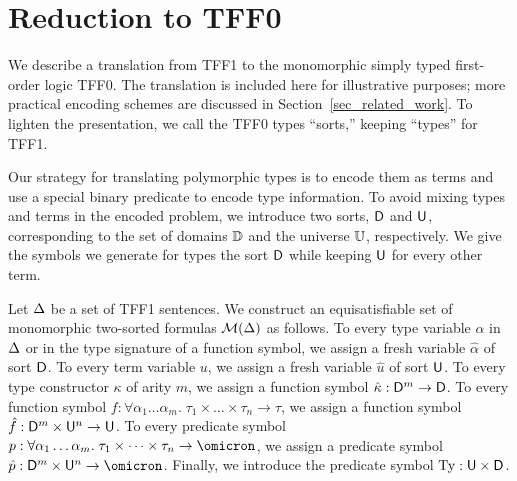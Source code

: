 \section{Reduction to TFF0} \label{sec:trans}

We describe a translation from TFF1 to the monomorphic simply typed first-order
logic TFF0. The translation is included here for illustrative purposes; more
practical encoding schemes are discussed in Section~\ref{sec_related_work}. To
lighten the presentation, we call the TFF0 types ``sorts,'' keeping ``types''
for TFF1.

Our strategy for translating polymorphic types is to encode them as terms and
use a special binary predicate to encode type information.
%
To avoid mixing types
and terms in the encoded problem, we introduce two sorts, $\mathsf{D}$ and $\mathsf{U}$,
corresponding to the set of domains $\mathbb{D}$ and the universe $\mathbb{U}$,
respectively. We give the symbols we generate for types the sort $\mathsf{D}$ while
keeping $\mathsf{U}$ for every other term.

Let $\mathrm{\Delta}$ be a set of TFF1 sentences.
We construct an equisatisfiable set of monomorphic two-sorted
formulas $\mathcal{M}(\mathrm{\Delta})$ as follows.
%
To every type variable $\alpha$ in $\mathrm{\Delta}$ or in the type signature of a function
symbol, we assign a fresh variable $\hat{\alpha}$ of sort $\mathsf{D}$.
To every term variable $u$, we assign
a fresh variable $\hat{u}$ of sort $\mathsf{U}$.
To every type constructor $\kappa$ of arity $m$, we assign
a function symbol $\hat{\kappa} : \mathsf{D}^m \to \mathsf{D}$.
To every function symbol $f : \forall \alpha_1\dots\alpha_m .\; \tau_1 \times \dots \times \tau_n \to \tau$,
we assign a function symbol $\hat{f} : \mathsf{D}^m \times \mathsf{U}^n \to \mathsf{U}$.
To every predicate symbol $p : \forall \alpha_1\dots\alpha_m .\; \tau_1 \times \dots \times \tau_n \to \omicron$,
we assign a predicate symbol $\hat{p} : \typ^m \times \und^n \to \omicron$.
Finally, we introduce the predicate symbol $\mathrm{Ty} : \mathsf{U} \times \mathsf{D}$.

